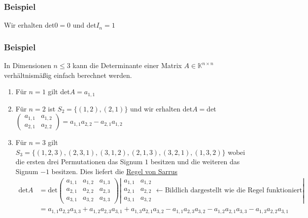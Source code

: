 \subsubsection{Beispiel}
Wir erhalten det$0=0$ und det$I_n=1$
\subsubsection{Beispiel}
In Dimensionen $n\leq 3$ kann die Determinante einer Matrix $A\in\mathbb{K}^{n\times n}$ verhältnismäßig einfach berechnet werden.
\begin{enumerate}
\item Für $n=1$ gilt det$A=a_{1,1}$
\item Für $n=2$ ist $S_2=\{(1,2),(2,1)\}$ und wir erhalten det$A=$det$\begin{pmatrix}a_{1,1} & a_{1,2}\\ a_{2,1} & a_{2,2}\end{pmatrix}=a_{1,1}a_{2,2}-a_{2,1}a_{1,2}$
\item Für $n=3$ gilt $S_3=\{(1,2,3),(2,3,1),(3,1,2),(2,1,3),(3,2,1),(1,3,2)\}$ wobei die ersten drei Permutationen das Signum $1$ besitzen und die weiteren das Signum $-1$ besitzen.  Dies liefert die  \underline{Regel von Sarrus}
\begin{align*}
\mathrm{det}A&=\mathrm{det}\begin{pmatrix}a_{1,1} & a_{1,2} & a_{1,3}\\ a_{2,1} & a_{2,2} & a_{2,3}\\ a_{3,1} & a_{3,2} & a_{3,3}\end{pmatrix} \left|\begin{matrix}a_{1,1} & a_{1,2}\\ a_{2,1} & a_{2,2}\\ a_{3,1} & a_{3,2}\end{matrix} \leftarrow \text{Bildlich dargestellt wie die Regel funktioniert}\right|\\
&=a_{1,1}a_{2,2}a_{3,3}+a_{1,2}a_{2,3}a_{3,1}+a_{1,3}a_{2,1}a_{3,2}-a_{1,1}a_{2,3}a_{3,2}-a_{1,2}a_{2,1}a_{3,3}-a_{1,3}a_{2,2}a_{3,1}
\end{align*}
\end{enumerate}
